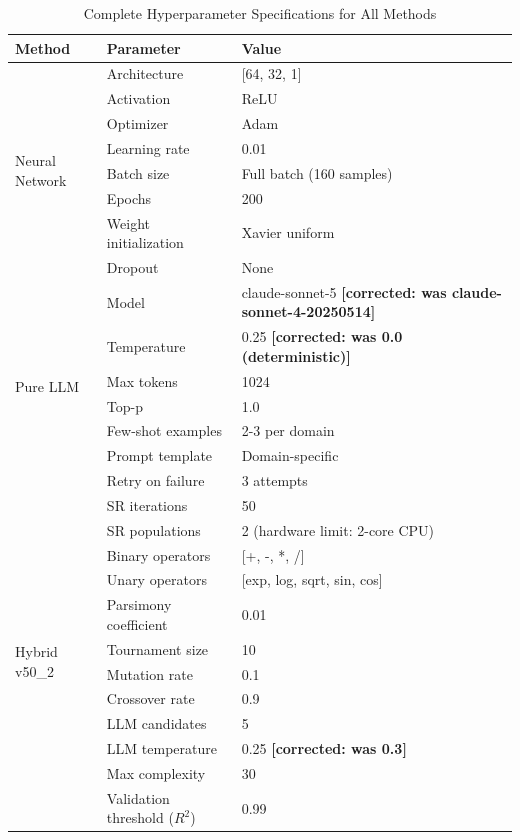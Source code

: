 \documentclass[twoside,11pt]{article}
\begin{document}
\begin{table}[H]
\centering
\caption{Complete Hyperparameter Specifications for All Methods}
\label{tab:hyperparameters_complete}
\small
\begin{tabular}{lll}
\toprule
\textbf{Method} & \textbf{Parameter} & \textbf{Value} \\
\midrule
\multirow{8}{*}{Neural Network}
& Architecture & [64, 32, 1] \\
& Activation & ReLU \\
& Optimizer & Adam \\
& Learning rate & 0.01 \\
& Batch size & Full batch (160 samples) \\
& Epochs & 200 \\
& Weight initialization & Xavier uniform \\
& Dropout & None \\
\midrule
\multirow{7}{*}{Pure LLM}
& Model & claude-sonnet-5 \textbf{[corrected: was
  claude-sonnet-4-20250514]} \\
& Temperature & 0.25 \textbf{[corrected: was 0.0 (deterministic)]} \\
& Max tokens & 1024 \\
& Top-p & 1.0 \\
& Few-shot examples & 2-3 per domain \\
& Prompt template & Domain-specific \\
& Retry on failure & 3 attempts \\
\midrule
\multirow{12}{*}{Hybrid v50\_2}
& SR iterations & 50 \\
& SR populations & 2 (hardware limit: 2-core CPU) \\
& Binary operators & [+, -, *, /] \\
& Unary operators & [exp, log, sqrt, sin, cos] \\
& Parsimony coefficient & 0.01 \\
& Tournament size & 10 \\
& Mutation rate & 0.1 \\
& Crossover rate & 0.9 \\
& LLM candidates & 5 \\
& LLM temperature & 0.25 \textbf{[corrected: was 0.3]} \\
& Max complexity & 30 \\
& Validation threshold ($R^2$) & 0.99 \\
\bottomrule
\end{tabular}
\end{table}
\end{document}
